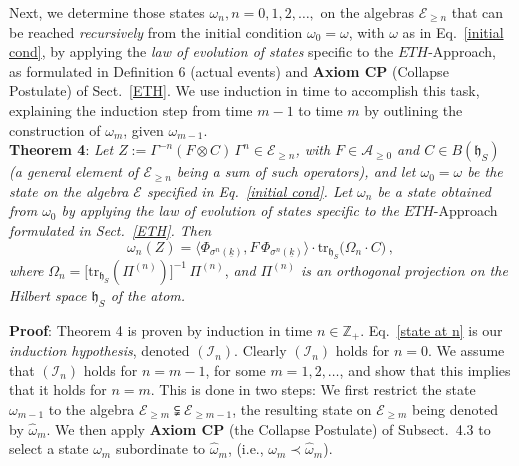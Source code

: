 \documentclass[a4paper,11pt]{article}
\begin{document}
Next, we determine those states $\omega_n, n=0,1,2, \dots,$ on the algebras $\mathcal{E}_{\geq n}$ that can be 
reached \textit{recursively} from the initial condition $\omega_0 = \omega$, with $\omega$ as in Eq.~\eqref{initial cond}, 
by applying the \textit{law of evolution of states} specific to the $ETH$-Approach, as formulated in Definition 6 
(actual events) and {\bf{Axiom CP}} (Collapse Postulate) of Sect.~\ref{ETH}. We use induction in time to accomplish this 
task, explaining the induction step from time $m-1$ to time $m$ by outlining the construction of $\omega_m$, given 
$\omega_{m-1}$. \\
 
{\bf{Theorem 4}}: \textit{Let $Z:= \Gamma^{-n}(F\otimes C)\,\Gamma^{n} \in \mathcal{E}_{\geq n}$, with 
$F\in \mathcal{A}_{\geq 0}$ and $C\in B(\mathfrak{h}_S)$ (a general element of $\mathcal{E}_{\geq n}$ being a sum of such operators), and let $\omega_0 =\omega$ be the state on the algebra 
$\mathcal{E}$ specified in Eq.~\eqref{initial cond}. Let $\omega_n$ be a state obtained from $\omega_0$ by applying 
the law of evolution of states specific to the} $ETH$-Approach \textit{formulated in Sect.~\ref{ETH}. Then}
\begin{equation}\label{state at n}
\omega_{n}(Z)= \langle \Phi_{\sigma^{n}(\underline{k})}, F \,\Phi_{\sigma^{n}(\underline{k})}\rangle 
\cdot \text{tr}_{\mathfrak{h}_S}\big(\Omega_n \cdot C\big)\,,
\end{equation}
\textit{where} $\Omega_{n} = \big[\text{tr}_{\mathfrak{h}_S} (\Pi^{(n)})\big]^{-1} \,\Pi^{(n)}$, \textit{and $\Pi^{(n)}$ 
is an orthogonal projection on the Hilbert space $\mathfrak{h}_S$ of the atom.}

{\bf{Proof}}:
Theorem 4 is proven by induction in time $n\in \mathbb{Z}_{+}$. Eq.~\eqref{state at n} is our \textit{induction hypothesis}, denoted $(\mathcal{I}_{n})$. 
Clearly $(\mathcal{I}_{n})$ holds for $n=0$. We assume that $(\mathcal{I}_{n})$ holds for $n=m-1$, for some $m=1,2,\dots$, 
and show that this implies that it holds for $n=m$. This is done in two steps: We first restrict the state $\omega_{m-1}$ 
to the algebra $\mathcal{E}_{\geq m}\subsetneqq \mathcal{E}_{\geq m-1}$, the resulting state on $\mathcal{E}_{\geq m}$ 
being denoted by $\widehat{\omega}_m$. We then apply {\bf{Axiom CP}} (the Collapse Postulate) of Subsect.~4.3 to 
select a state $\omega_m$ subordinate to $\widehat{\omega}_m$, (i.e., $\omega_m \prec \widehat{\omega}_m$).
\end{document}
